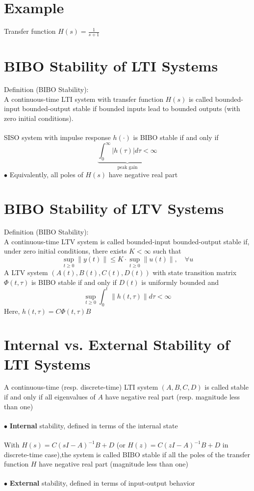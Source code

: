 \documentclass[10pt,a4paper,oneside]{article}
\begin{document}
\section{Example}
Transfer function $H(s)=\frac{1}{s+1}$
\section{BIBO Stability of LTI Systems}
Definition (BIBO Stability):\\
A continuous-time LTI system with transfer function $H(s)$ is called
bounded-input bounded-output stable if bounded inputs lead to bounded
outputs (with zero initial conditions).\\
\\SISO system with impulse response $h(\cdot)$ is BIBO stable if and only if
\[
\underbrace{\int_{0}^{\infty}|h(\tau)| d \tau<\infty}_{\text { peak gain }}
\]
$\bullet$ Equivalently, all poles of $H(s)$ have negative real part
\section{BIBO Stability of LTV Systems}
Definition (BIBO Stability):\\
A continuous-time LTV system is called bounded-input bounded-output 
stable if, under zero initial conditions, there exists $K<\infty$ such that
\[
\sup _{t \geq 0}\|y(t)\| \leq K \cdot \sup _{t \geq 0}\|u(t)\|, \quad \forall u
\]
A LTV system $(A(t), B(t), C(t), D(t))$ with state transition matrix $\Phi(t, \tau)$
is BIBO stable if and only if $D(t)$ is uniformly bounded and
\[
\sup _{t \geq 0} \int_{0}^{t}\|h(t, \tau)\| d \tau<\infty
\]
Here, $h(t, \tau)=C \Phi(t, \tau) B$
\section{Internal vs. External Stability of LTI Systems}
A continuous-time (resp. discrete-time) LTI system $(A, B, C, D)$ is called stable if and only if all eigenvalues of $A$ have negative real part (resp. magnitude less than one)\\
\\$\bullet$ {\bfseries Internal} stability, defined in terms of the internal state\\
\\With $H(s)=C(sI-A)^{-1} B+D$ (or $H(z)=C(zI-A)^{-1} B+D$ in discrete-time case),the system is called BIBO stable if all the poles of the transfer function $H$ have negative real part (magnitude less than one)\\
\\$\bullet$ {\bfseries External} stability, defined in terms of input-output behavior
\end{document}
